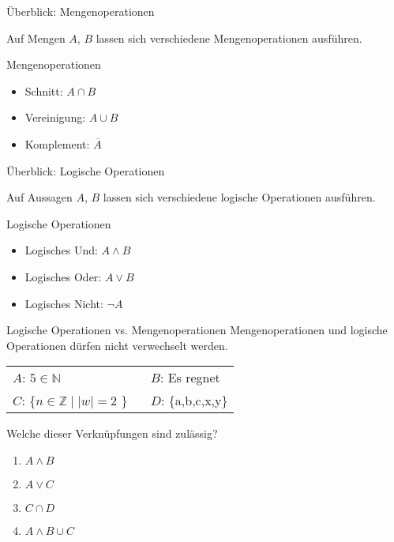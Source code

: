 \begin{frame}{Überblick: Mengenoperationen}

	Auf \alert{Mengen} $A$, $B$ lassen sich verschiedene Mengenoperationen ausführen.

	\begin{exampleblock}{Mengenoperationen}
		\begin{itemize}
			\item Schnitt: $A \cap B$
			\item Vereinigung: $A \cup B$
			\item Komplement: $\overline{A}$
		\end{itemize}
	\end{exampleblock}
\end{frame}

\begin{frame}{Überblick: Logische Operationen}

	Auf \alert{Aussagen} $A$, $B$ lassen sich verschiedene logische Operationen ausführen.

	\begin{exampleblock}{Logische Operationen}
		\begin{itemize}
			\item Logisches Und: $A \wedge B$
			\item Logisches Oder: $A \vee B$
			\item Logisches Nicht: $\neg A$
		\end{itemize}
	\end{exampleblock}
\end{frame}

{
	\begin{frame}{Logische Operationen vs. Mengenoperationen}
		\alert{Mengenoperationen und logische Operationen dürfen nicht verwechselt werden.}
		\begin{table}[]
			\begin{tabular}{l l}
				$A$: $5 \in \mathbb{N}$ & $B$: Es regnet\\
				$C$: \{$n \in \mathbb{Z} \mid |w|=2$ \} \ & $D$: \{a,b,c,x,y\}\\
			\end{tabular}
		\end{table}
		\begin{block}{Welche dieser Verknüpfungen sind zulässig?}
			\begin{enumerate}
				\item $A \wedge B$
				\item $A \vee C$
				\item $C \cap D$
				\item $A \wedge B \cup C$
			\end{enumerate}
		\end{block}
	\end{frame}
}

